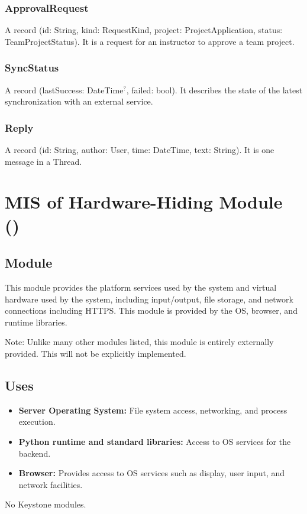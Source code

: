 \documentclass[12pt, titlepage]{article}
\newcommand{\moduleid}[1]{\texttt{\detokenize{#1}}}
\begin{document}
\subsubsection{ApprovalRequest}
A record (id: String, kind: RequestKind, project: ProjectApplication, status: TeamProjectStatus).
It is a request for an instructor to approve a team project.

\subsubsection{SyncStatus}
A record (lastSuccess: DateTime$^{?}$, failed: bool).
It describes the state of the latest synchronization with an external service.

\subsubsection{Reply}
A record (id: String, author: User, time: DateTime, text: String).
It is one message in a Thread.


\section[MIS of Hardware-Hiding Module]{MIS of Hardware-Hiding Module (\moduleid{M_HardwareHiding})}
\label{M_HardwareHiding}



\subsection{Module}

This module provides the platform services used by the system and virtual hardware used by the system, including input/output, file storage, and network connections including HTTPS. This module is provided by the OS, browser, and runtime libraries.

Note: Unlike many other modules listed, this module is entirely externally provided. This will not be explicitly implemented.

\subsection{Uses}
\begin{itemize}
  \item \textbf{Server Operating System:} File system access, networking, and process execution. 
  \item \textbf{Python runtime and standard libraries:} Access to OS services for the backend. 
  \item \textbf{Browser:} Provides access to OS services such as display, user input, and network facilities.
\end{itemize}
No Keystone modules.
\end{document}
